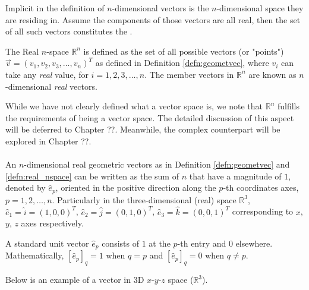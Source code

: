 Implicit in the definition of $n$-dimensional vectors is the $n$-dimensional space they are residing in. Assume the components of those vectors are all real, then the set of all such vectors constitutes the .
\begin{defn}
\label{defn:real_nspace}
The Real $n$-space $\mathbb{R}^n$ is defined as the set of all possible vectors (or "points") $\vec{v} = (v_1, v_2, v_3, \ldots, v_n)^T$ as defined in Definition \ref{defn:geometvec}, where $v_i$ can take any \textit{real} value, for $i = 1,2,3,\ldots,n$. The member vectors in $\mathbb{R}^n$ are known as $n$-dimensional \textit{real} vectors.
\end{defn}
While we have not clearly defined what a vector space is, we note that $\mathbb{R}^n$ fulfills the requirements of being a vector space. The detailed discussion of this aspect will be deferred to Chapter ??. Meanwhile, the complex counterpart will be explored in Chapter ??.\\
\\
An $n$-dimensional real geometric vectors as in Definition \ref{defn:geometvec} and \ref{defn:real_nspace} can be written as the sum of $n$  that have a magnitude of $1$, denoted by $\hat{e}_p$, oriented in the positive direction along the $p$-th coordinates axes, $p = 1,2,\ldots,n$. Particularly in the three-dimensional (real) space $\mathbb{R}^3$, $\hat{e}_1 = \hat{i} = (1,0,0)^T$, $\hat{e}_2 = \hat{j} = (0,1,0)^T$, $\hat{e}_3 = \hat{k} = (0,0,1)^T$ corresponding to $x$, $y$, $z$ axes respectively.
\begin{defn}
A standard unit vector $\hat{e}_p$ consists of $1$ at the $p$-th entry and $0$ elsewhere. Mathematically, $[\hat{e}_p]_q = 1$ when $q=p$ and $[\hat{e}_p]_q = 0$ when $q\neq p$.
\end{defn}
Below is an example of a vector in 3D $x$-$y$-$z$ space ($\mathbb{R}^3$).
